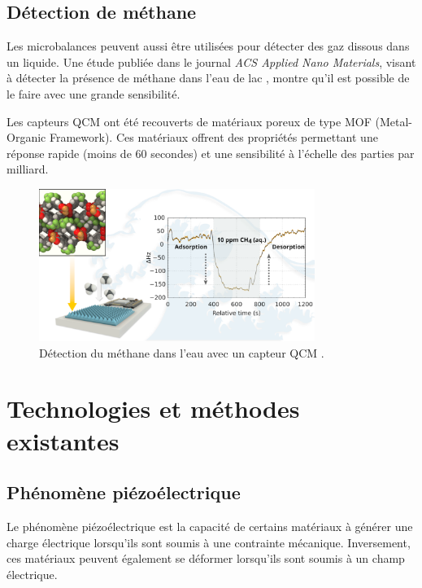 \subsection{Détection de méthane}

Les microbalances peuvent aussi être utilisées pour détecter des gaz dissous dans un liquide.  
Une étude publiée dans le journal \textit{ACS Applied Nano Materials}, visant à détecter la présence de méthane dans l’eau de lac \cite{doi:10.1021/acsanm.4c06883},  
montre qu'il est possible de le faire avec une grande sensibilité.

Les capteurs QCM ont été recouverts de matériaux poreux de type MOF (Metal-Organic Framework).  
Ces matériaux offrent des propriétés permettant une réponse rapide (moins de 60 secondes) et une sensibilité à l’échelle des parties par milliard.

\begin{figure}[H]
    \centering
    \includegraphics[width=0.8\textwidth]{assets/figures/methane sensor.png}
    \caption{Détection du méthane dans l'eau avec un capteur QCM \cite{doi:10.1021/acsanm.4c06883}.}
    \label{fig:methane_detection}
\end{figure}

\section{Technologies et méthodes existantes}

\subsection{Phénomène piézoélectrique}

Le phénomène piézoélectrique est la capacité de certains matériaux à générer une charge électrique lorsqu’ils sont soumis à une contrainte mécanique.  
Inversement, ces matériaux peuvent également se déformer lorsqu’ils sont soumis à un champ électrique.

